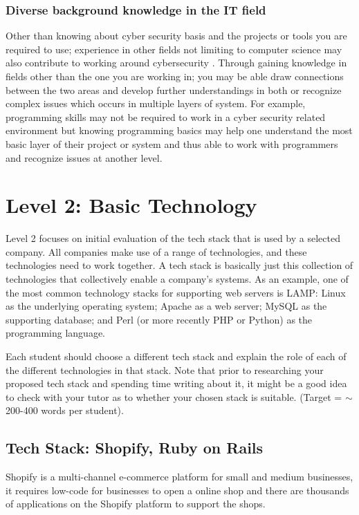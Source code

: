 \documentclass[a4paper, 11pt]{report}
\begin{document}
\subsubsection{Diverse background knowledge in the IT field}
Other than knowing about cyber security basis and the projects or tools you are required to use; experience in other fields not limiting to computer science may also contribute to working around cybersecurity \cite{dawson2018future}. Through gaining knowledge in fields other than the one you are working in; you may be able draw connections between the two areas and develop further understandings in both or recognize complex issues which occurs in multiple layers of system. For example, programming skills may not be required to work in a cyber security related environment but knowing programming basics may help one understand the most basic layer of their project or system and thus able to work with programmers and recognize issues at another level.  




\newpage
\section{Level 2: Basic Technology}

Level 2 focuses on initial evaluation of the tech stack that is used by a selected company. All companies make use of a range of technologies, and these technologies need to work together. A tech stack is basically just this collection of technologies that collectively enable a company's systems. As an example, one of the most common technology stacks for supporting web servers is LAMP: Linux as the underlying operating system; Apache as a web server; MySQL as the supporting database; and Perl (or more recently PHP or Python) as the programming language.

Each student should choose a different tech stack and explain the role of each of the different technologies in that stack. Note that prior to researching your proposed tech stack and spending time writing about it, it might be a good idea to check with your tutor as to whether your chosen stack is suitable. (Target = $\sim$200-400 words per student).

\subsection{Tech Stack: Shopify, Ruby on Rails}
\indent Shopify is a multi-channel e-commerce platform for small and medium businesses, it requires low-code for businesses to open a online shop and there are thousands of applications on the Shopify platform to support the shops.
\end{document}
